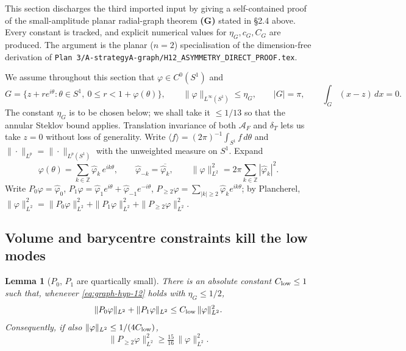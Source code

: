 \documentclass[11pt]{amsart}
\newtheorem{lemma}[theorem]{Lemma}
\newcommand{\dT}{\delta_T}
\newcommand{\AF}{\mathcal A_F}
\begin{document}
This section discharges the third imported input by giving a
self-contained proof of the small-amplitude planar radial-graph
theorem \textbf{(G)} stated in \S2.4 above.  Every constant is
tracked, and explicit numerical values for \(\eta_G,c_G,C_G\) are
produced.
The argument is the planar (\(n=2\)) specialisation of the
dimension-free derivation of
\texttt{Plan~3/A-strategyA-graph/H12\_ASYMMETRY\_DIRECT\_PROOF.tex}.

We assume throughout this section that
\(\varphi\in C^0(S^1)\) and
\begin{equation}\label{eq:graph-hyp-12}
   G=\{z+r e^{i\theta}:\theta\in S^1,\ 0\le r<1+\varphi(\theta)\},
   \qquad
   \|\varphi\|_{L^\infty(S^1)}\le\eta_G,
   \qquad
   |G|=\pi,
   \qquad
   \int_G(x-z)\,dx=0.
\end{equation}
The constant \(\eta_G\) is to be chosen below; we shall take it
\(\le 1/13\) so that the annular Steklov bound applies.  Translation
invariance of both \(\AF\) and \(\dT\) lets us take \(z=0\) without
loss of generality.  Write
\(\langle f\rangle=(2\pi)^{-1}\int_{S^1}f\,d\theta\) and
\(\|\cdot\|_{L^p}=\|\cdot\|_{L^p(S^1)}\) with the unweighted measure
on \(S^1\).  Expand
\begin{equation}\label{eq:fourier-12}
   \varphi(\theta)=\sum_{k\in\mathbb Z}\hat\varphi_k\,e^{ik\theta},
   \qquad
   \hat\varphi_{-k}=\overline{\hat\varphi_k},
   \qquad
   \|\varphi\|_{L^2}^2=2\pi\sum_{k\in\mathbb Z}|\hat\varphi_k|^2 .
\end{equation}
Write
\(P_0\varphi=\hat\varphi_0\),
\(P_1\varphi=\hat\varphi_{1}e^{i\theta}+\hat\varphi_{-1}e^{-i\theta}\),
\(P_{\ge 2}\varphi=\sum_{|k|\ge 2}\hat\varphi_k e^{ik\theta}\); by
Plancherel,
\(\|\varphi\|_{L^2}^2
   =\|P_0\varphi\|_{L^2}^2+\|P_1\varphi\|_{L^2}^2+\|P_{\ge 2}\varphi\|_{L^2}^2\).

\subsection{Volume and barycentre constraints kill the low modes}
\label{ss:G12-modes}

\begin{lemma}[\(P_0\), \(P_1\) are quartically small]
\label{lem:G12-modes}
There is an absolute constant \(C_{\rm low}\le 1\) such that,
whenever \eqref{eq:graph-hyp-12} holds with \(\eta_G\le 1/2\),
\begin{equation}\label{eq:G12-P0-P1}
   \|P_0\varphi\|_{L^2}+\|P_1\varphi\|_{L^2}
      \le C_{\rm low}\,\|\varphi\|_{L^2}^2 .
\end{equation}
Consequently, if also \(\|\varphi\|_{L^2}\le 1/(4 C_{\rm low})\),
\begin{equation}\label{eq:G12-Pge2}
   \|P_{\ge 2}\varphi\|_{L^2}^2
     \ge\tfrac{15}{16}\,\|\varphi\|_{L^2}^2 .
\end{equation}
\end{lemma}
\end{document}
